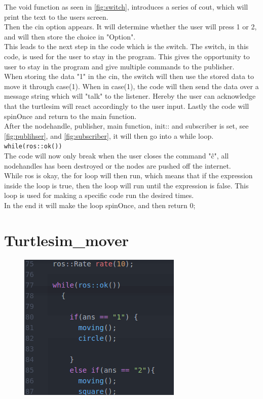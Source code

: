 The void function as seen in \ref{fig:switch}, introduces a series of cout, which will print the text to the users screen.\\
Then the cin option appears. It will determine whether the user will press 1 or 2, and will then store the choice in "Option".\\
This leads to the next step in the code which is the switch. The switch, in this code, is used for the user to stay in the program. This gives the opportunity to user to stay in the program and give multiple commands to the publisher.\\
When storing the data "1" in the cin, the switch will then use the stored data to move it through case(1). When in case(1), the code will then send the data over a message string which will "talk" to the listener. Hereby the user can acknowledge that the turtlesim will react accordingly to the user input. Lastly the code will spinOnce and return to the main function.\\
After the nodehandle, publisher, main function, init:: and subscriber is set, see \ref{fig:publihser}, and \ref{fig:subscriber}, it will then go into a while loop.\\
\texttt{while(ros::ok())}\\
The code will now only break when the user closes the command "\^c", all nodehandles has been destroyed or the nodes are pushed off the internet.\\
While ros is okay, the for loop will then run, which means that if the expression inside the loop is true, then the loop will run until the expression is false. This loop is used for making a specific code run the desired times.\\
In the end it will make the loop spinOnce, and then return 0;\\



\section{Turtlesim\_mover}

\begin{figure}[h]
\begin{center}
\includegraphics[width=.5\textwidth]{figures/while.png}
\end{center}
\end{figure}\label{fig:while}



